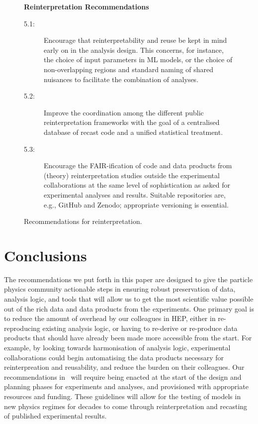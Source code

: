 \documentclass[11pt]{article}
\begin{document}
\begin{figure}[!ht]
\begin{tcolorbox}
\begin{center}
{\large \textbf{Reinterpretation Recommendations}}
\end{center}
%
\begin{description}
   \item[5.1:] Encourage that reinterpretability and reuse be kept in mind early on in the analysis design. This concerns, for instance, the choice of input parameters in \gls{ML} models, or the choice of non-overlapping regions and standard naming of shared nuisances to facilitate the combination of analyses.
   \item[5.2:] Improve the coordination among the different public reinterpretation frameworks  with the goal of a centralised database of recast code and a unified statistical treatment.
   \item[5.3:] Encourage the \gls{FAIR}-ification of code and \glspl{data product} from (theory) reinterpretation studies outside the experimental collaborations at the same level of sophistication as asked for experimental analyses and results. Suitable repositories are, e.g., GitHub and Zenodo; appropriate versioning is essential.
\end{description}
\end{tcolorbox}
\caption{Recommendations for reinterpretation.}
\label{fig:recs_reinterpretation}
\end{figure}

\section{Conclusions}

The recommendations we put forth in this paper are designed to give the particle physics community actionable steps in ensuring robust preservation of data, analysis logic, and tools that will allow us to get the most scientific value possible out of the rich data and data products from the experiments.
One primary goal is to reduce the amount of overhead by our colleagues in \gls{HEP}, either in re-reproducing existing analysis logic, or having to re-derive or re-produce data products that should have already been made more accessible from the start.
For example, by looking towards harmonisation of analysis logic, experimental collaborations could begin automatising the data products necessary for reinterpreation and reusability, and reduce the burden on their colleagues.
Our recommendations in~ will require being enacted at the start of the design and planning phases for experiments and analyses, and provisioned with appropriate resources and funding. These guidelines will allow for the testing of models in new physics regimes for decades to come through reinterpretation and recasting of published experimental results.
\end{document}
